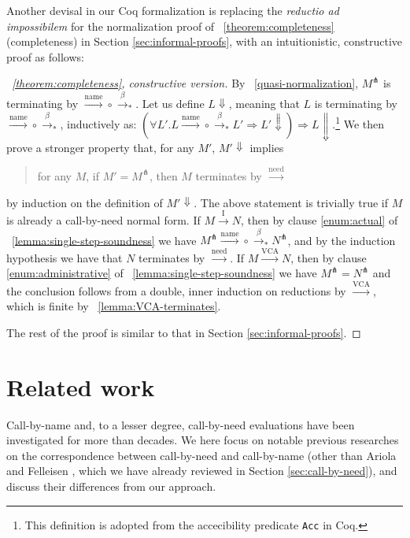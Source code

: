 \documentclass{llncs}
\newcommand{\EXPANDLET}[1]{#1^\pitchfork}
\newcommand{\FULLBETA}{\xrightarrow{\beta}}
\newcommand{\CALLBYNAME}{\xrightarrow{\mathrm{name}}}
\newcommand{\CALLBYNEED}{\xrightarrow{\mathrm{need}}}
\newcommand{\CALLBYNEEDI}{\xrightarrow{\mathrm{I}}}
\newcommand{\CALLBYNEEDVCA}{\xrightarrow{\mathrm{VCA}}}
\newcommand{\RTCLOS}[1]{#1_*}
\begin{document}
Another devisal in our Coq formalization is replacing the \emph{reductio ad impossibilem} for the normalization proof of \theoremname~\ref{theorem:completeness} (completeness) in Section \ref{sec:informal-proofs}, with an intuitionistic, constructive proof as follows:
\begin{proof}[\theoremname~\ref{theorem:completeness}, constructive version]
	By \lemmaname~\ref{quasi-normalization}, $\EXPANDLET{M}$ is terminating by ${\CALLBYNAME}\circ{\RTCLOS{\FULLBETA}}$.
	Let us define $L \Downarrow$, meaning that $L$ is terminating by ${\CALLBYNAME}\circ{\RTCLOS{\FULLBETA}}$, inductively as:
	$(\forall L'. L {\CALLBYNAME}\circ{\RTCLOS{\FULLBETA}} L' \Rightarrow L' \Downarrow) \Rightarrow L \Downarrow$.\footnote{This definition is adopted from the accecibility predicate \texttt{Acc} in Coq.}
	We then prove a stronger property that, for any $M'$, $M' \Downarrow$ implies
\begin{quote}
for any $M$, if $M' = \EXPANDLET{M}$, then $M$ terminates by $\CALLBYNEED$
\end{quote}
by induction on the definition of $M' \Downarrow$.
The above statement is trivially true if $M$ is already a call-by-need normal form.
If $M \CALLBYNEEDI N$, then by clause \ref{enum:actual} of \lemmaname~\ref{lemma:single-step-soundness} we have
$\EXPANDLET{M} {\CALLBYNAME}\circ{\RTCLOS{\FULLBETA}} \EXPANDLET{N}$, and by the induction hypothesis we have that $N$ terminates by $\CALLBYNEED$.
If $M \CALLBYNEEDVCA N$, then by clause \ref{enum:administrative} of \lemmaname~\ref{lemma:single-step-soundness} we have $\EXPANDLET{M} = \EXPANDLET{N}$ and the conclusion follows from a double, inner induction on reductions by $\CALLBYNEEDVCA$, which is finite by \lemmaname~\ref{lemma:VCA-terminates}.

The rest of the proof is similar to that in Section \ref{sec:informal-proofs}.
\end{proof}
%
\section{Related work}\label{sec:previous-researches}
%
Call-by-name and, to a lesser degree, call-by-need evaluations have been investigated for more than decades.
We here focus on notable previous researches on the correspondence between call-by-need and call-by-name (other than Ariola and Felleisen \cite{Ariola97}, which we have already reviewed in Section \ref{sec:call-by-need}), and discuss their differences from our approach.
\end{document}
